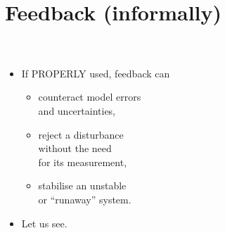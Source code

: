 \section{Feedback (informally)}
\subsection{}

\begin{frame}\mccz
{}
\myPause
 \begin{columns}
   \myPause%
   \begin{itemize}[<+-| alert@+>]
   \item If PROPERLY used, feedback can
         \begin{itemize}[<+-| alert@+>]
         \item \vspace{2mm}counteract model errors\\
                and uncertainties,
         \item \vspace{2mm}reject a disturbance\\
                without the need\\
                for its measurement,
         \item \vspace{2mm}stabilise an unstable\\
               or ``runaway'' system.
         \end{itemize}
   \item \vspace{4mm}Let us see.
   \end{itemize}
 \end{columns}
\end{frame}

